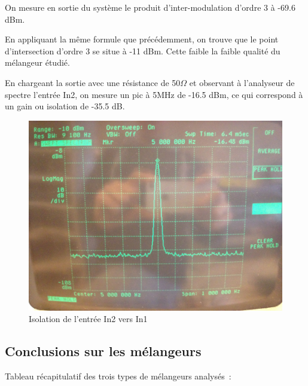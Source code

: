 \documentclass{article}
\begin{document}
On mesure en sortie du système le produit d'inter-modulation d'ordre 3 à -69.6 dBm.

En appliquant la même formule que précédemment, on trouve que le point d'intersection d'ordre 3 se situe à -11 dBm. Cette faible la faible qualité du mélangeur étudié.



En chargeant la sortie avec une résistance de 50$\Omega$ et observant à l'analyseur de spectre l'entrée In2, on mesure un pic à 5MHz de -16.5 dBm, ce qui correspond à un gain ou isolation de -35.5 dB.

\begin{figure}[h!]
	\centering
	\includegraphics[width=.7\textwidth]{11_3_5}
	\caption{Isolation de l'entrée In2 vers In1}
	\label{fig:11_3_5}
\end{figure}



\clearpage


\subsection{Conclusions sur les mélangeurs}


Tableau récapitulatif des trois types de mélangeurs analysés~:
\end{document}
